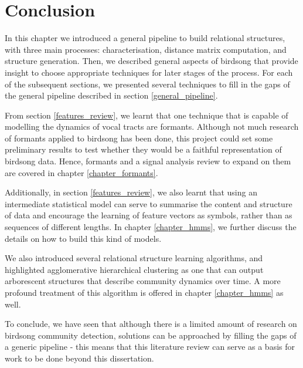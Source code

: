 \documentclass[../main.tex]{subfiles} \label{chapter_soa}
\begin{document}
\section{Conclusion}
In this chapter we introduced a general pipeline to build relational structures, with three main processes: characterisation, distance matrix computation, and structure generation. Then, we described general aspects of birdsong that provide insight to choose appropriate techniques for later stages of the process. For each of the subsequent sections, we presented several techniques to fill in the gaps of the general pipeline described in section \ref{general_pipeline}.
\par From section \ref{features_review}, we learnt that one technique that is capable of modelling the dynamics of vocal tracts are formants. Although not much research of formants applied to birdsong has been done, this project could set some preliminary results to test whether they would be a faithful representation of birdsong data. Hence, formants and a signal analysis review to expand on them are covered in chapter \ref{chapter_formants}.
\par Additionally, in section \ref{features_review}, we also learnt that using an intermediate statistical model can serve to summarise the content and structure of data and encourage the learning of feature vectors as symbols, rather than as sequences of different lengths. In chapter \ref{chapter_hmms}, we further discuss the details on how to build this kind of models.
\par We also introduced several relational structure learning algorithms, and highlighted agglomerative hierarchical clustering as one that can output arborescent structures that describe community dynamics over time. A more profound treatment of this algorithm is offered in chapter \ref{chapter_hmms} as well. 
\par To conclude, we have seen that although there is a limited amount of research on birdsong community detection, solutions can be approached by filling the gaps of a generic pipeline - this means that this literature review can serve as a basis for work to be done beyond this dissertation.
\end{document}
